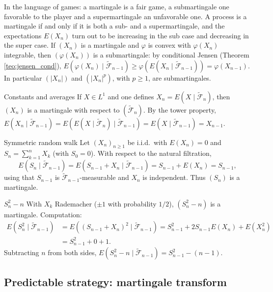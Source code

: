\documentclass[11pt, a4paper]{article}
\begin{document}
\obs In the language of games: a martingale is a fair game, a submartingale one
favorable to the player and a supermartingale an unfavorable one. A process is a martingale if and
only if it is both a sub- and a supermartingale, and the expectations $E(X_n)$ turn out to be increasing in the
sub case and decreasing in the super case. If $(X_n)$ is a martingale and $\varphi$ is convex with
$\varphi(X_n)$ integrable, then $(\varphi(X_n))$ is a submartingale: by conditional Jensen
(Theorem \ref{teo:jensen_cond}),
$E(\varphi(X_n) \mid \widetilde{\mathcal{F}}_{n-1}) \ge
\varphi(E(X_n \mid \widetilde{\mathcal{F}}_{n-1})) = \varphi(X_{n-1})$. In particular
$(|X_n|)$ and $(|X_n|^p)$, with $p \ge 1$, are submartingales.

\begin{ejemplo}{Constants and averages}{}
If $X \in L^1$ and one defines $X_n = E(X \mid \widetilde{\mathcal{F}}_n)$, then $(X_n)$ is a
martingale with respect to $(\widetilde{\mathcal{F}}_n)$. By the tower property,
$E(X_n \mid \widetilde{\mathcal{F}}_{n-1}) = E(E(X \mid \widetilde{\mathcal{F}}_n) \mid
\widetilde{\mathcal{F}}_{n-1}) = E(X \mid \widetilde{\mathcal{F}}_{n-1}) = X_{n-1}$.
\end{ejemplo}

\begin{ejemplo}{Symmetric random walk}{}
Let $(X_n)_{n \ge 1}$ be i.i.d.\ with $E(X_n) = 0$ and $S_n = \sum_{k=1}^n X_k$ (with $S_0 = 0$).
With respect to the natural filtration,
$$ E(S_n \mid \widetilde{\mathcal{F}}_{n-1}) = E(S_{n-1} + X_n \mid \widetilde{\mathcal{F}}_{n-1})
= S_{n-1} + E(X_n) = S_{n-1}, $$
using that $S_{n-1}$ is $\widetilde{\mathcal{F}}_{n-1}$-measurable and $X_n$ is independent. Thus
$(S_n)$ is a martingale.
\end{ejemplo}

\begin{ejemplo}{$S_n^2 - n$}{}
With $X_k$ Rademacher ($\pm 1$ with probability $1/2$), $(S_n^2 - n)$ is a martingale. Computation:
\begin{align*}
E(S_n^2 \mid \widetilde{\mathcal{F}}_{n-1}) &= E((S_{n-1} + X_n)^2 \mid
\widetilde{\mathcal{F}}_{n-1})
= S_{n-1}^2 + 2 S_{n-1} E(X_n) + E(X_n^2) \\
&= S_{n-1}^2 + 0 + 1.
\end{align*}
Subtracting $n$ from both sides, $E(S_n^2 - n \mid \widetilde{\mathcal{F}}_{n-1}) = S_{n-1}^2 - (n-1)$.
\end{ejemplo}

\subsection{Predictable strategy: martingale transform}
\end{document}
